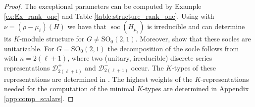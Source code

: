 \documentclass[JEP,XML,SOM,NoFloatCountersInSection,Unicode,published]{cedram}
\theoremstyle{definition}
\newcommand{\mc}[1]{\ensuremath{\mathcal{#1}}}
\newcommand{\on}[1]{\ensuremath{\operatorname{#1}}}
\newcommand{\rhoa}{\ensuremath{\rho}}
\newcommand{\pst}[1]{\ensuremath{H_{#1}}}
\newcommand{\GSO}[1]{\ensuremath{\mathrm{SO}_0(#1,1)}}
\begin{document}
\begin{proof}
The exceptional parameters can be computed by Example \ref{ex:Ex_rank_one} and Table \ref{table:structure_rank_one}. Using \cite[Th.\,5.1(2-4)]{JW} \resp \cite[Th.\,5.2(2)]{JW2} with $\nu=(\rhoa-\mu_\ell)(H)$ we have that $\on{soc}(\pst{\mu_\ell})$ is irreducible and can determine its $K$-module structure for $G\neq\GSO{2}$. Moreover, \cite[Th.\,6.3(1-3)]{JW} \resp \cite[Th.\,5.3(2)]{JW2} show that these socles are unitarizable. For $G=\GSO{2}$ the decomposition of the socle follows from \cite[p.\,38]{Kna86} with $n=2(\ell+1)$, where two (unitary, irreducible) discrete series representations $\mc D_{2(\ell+1)}^+$ and $\mc D_{2(\ell+1)}^-$ occur. The $K$-types of these representations are determined in \cite[p.\,40]{Kna86}. The highest weights of the $K$-representations needed for the computation of the minimal $K$-types are determined in Appendix \ref{app:comp_scalars}.
\end{proof}
\end{document}
